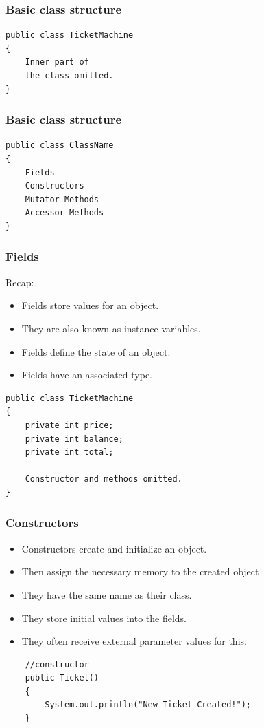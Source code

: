 \documentclass{beamer}
\begin{document}
\begin{frame}[fragile]
\frametitle{Basic class structure}
\begin{lstlisting}
public class TicketMachine
{
    Inner part of 
    the class omitted.
}
\end{lstlisting}
\end{frame}

\begin{frame}[fragile]
\frametitle{Basic class structure}
\begin{lstlisting}
public class ClassName
{
    Fields
    Constructors
    Mutator Methods
    Accessor Methods
} 
\end{lstlisting}
\end{frame}

\begin{frame}[fragile]
\frametitle{Fields}
Recap:
\begin{itemize}
\item \alert{Fields} store values for an object.
\item They are also known as \alert{instance variables}.
\item Fields define the \alert{state} of an object.
\item Fields have an associated \alert{type}.
\end{itemize}

\begin{lstlisting}
public class TicketMachine
{
    private int price;
    private int balance;
    private int total;
 
    Constructor and methods omitted.
} 
\end{lstlisting}
\end{frame}

\begin{frame}[fragile]
\frametitle{Constructors}
\begin{itemize}
\item Constructors create and initialize an object.
\item Then assign the necessary memory to the created object
\item They have the same name as their class.
\item They store initial values into the fields.
\item They often receive external parameter values for this.
\end{itemize}

\begin{lstlisting}
    //constructor
    public Ticket()
    {
        System.out.println("New Ticket Created!");
    } 
\end{lstlisting}
\end{frame}
\end{document}
